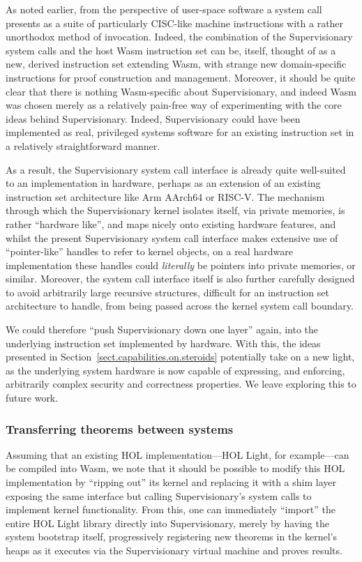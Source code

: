 \documentclass[a4paper, UKenglish, cleveref, autoref, thm-restate, colorlinks]{lipics-v2021}
\begin{document}
As noted earlier, from the perspective of user-space software a system call presents as a suite of particularly CISC-like machine instructions with a rather unorthodox method of invocation.
Indeed, the combination of the Supervisionary system calls and the host Wasm instruction set can be, itself, thought of as a new, derived instruction set extending Wasm, with strange new domain-specific instructions for proof construction and management.
Moreover, it should be quite clear that there is nothing Wasm-specific about Supervisionary, and indeed Wasm was chosen merely as a relatively pain-free way of experimenting with the core ideas behind Supervisionary.
Indeed, Supervisionary could have been implemented as real, privileged systems software for an existing instruction set in a relatively straightforward manner.

As a result, the Supervisionary system call interface is already quite well-suited to an implementation in hardware, perhaps as an extension of an existing instruction set architecture like Arm AArch64 or RISC-V.
The mechanism through which the Supervisionary kernel isolates itself, via private memories, is rather ``hardware like'', and maps nicely onto existing hardware features, and whilst the present Supervisionary system call interface makes extensive use of ``pointer-like'' handles to refer to kernel objects, on a real hardware implementation these handles could \emph{literally} be pointers into private memories, or similar.
Moreover, the system call interface itself is also further carefully designed to avoid arbitrarily large recursive structures, difficult for an instruction set architecture to handle, from being passed across the kernel system call boundary.

We could therefore ``push Supervisionary down one layer'' again, into the underlying instruction set implemented by hardware.
With this, the ideas presented in Section~\ref{sect.capabilities.on.steroids} potentially take on a new light, as the underlying system hardware is now capable of expressing, and enforcing, arbitrarily complex security and correctness properties.
We leave exploring this to future work.

\subsubsection*{Transferring theorems between systems}

Assuming that an existing HOL implementation---HOL Light, for example---can be compiled into Wasm, we note that it should be possible to modify this HOL implementation by ``ripping out'' its kernel and replacing it with a shim layer exposing the same interface but calling Supervisionary's system calls to implement kernel functionality.
From this, one can immediately ``import'' the entire HOL Light library directly into Supervisionary, merely by having the system bootstrap itself, progressively registering new theorems in the kernel's heaps as it executes via the Supervisionary virtual machine and proves results.
\end{document}
